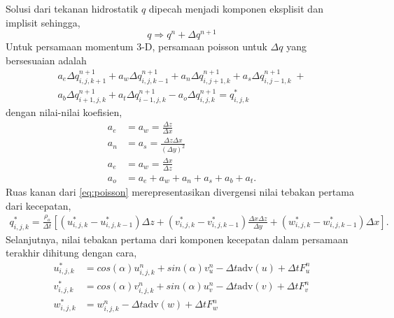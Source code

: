 \begin{spacing}{1.5}
	Solusi dari tekanan hidrostatik $q$ dipecah menjadi komponen eksplisit dan implisit sehingga,
	\begin{equation*}
		q \Rightarrow q^n + \Delta q^{n+1}
	\end{equation*}
	Untuk persamaan momentum 3-D, persamaan poisson untuk $\Delta q$ yang bersesuaian adalah
	\begin{equation}\label{eq:poisson}
		\begin{aligned}
			a_e \Delta q_{i,j,k+1}^{n+1} + a_w \Delta q_{i,j,k-1}^{n+1} + a_n \Delta q_{i,j+1,k}^{n+1} + a_s \Delta q_{i,j-1,k}^{n+1} \; + \\
			a_b \Delta q_{i+1,j,k}^{n+1} + 
			a_t \Delta q_{i-1,j,k}^{n+1} -
			a_o \Delta q_{i,j,k}^{n+1} = q_{i,j,k}^{*}
		\end{aligned}
	\end{equation}
	dengan nilai-nilai koefisien,
	\begin{equation}
		\begin{aligned}
			a_e &= a_w = \frac{\Delta z}{\Delta x} \\
			a_n &= a_s = \frac{\Delta z \Delta x}{(\Delta y)^2} \\
			a_e &= a_w = \frac{\Delta x}{\Delta z} \\
			a_o &= a_e + a_w + a_n + a_s + a_b + a_t.
		\end{aligned}
	\end{equation}
	Ruas kanan dari \ref{eq:poisson} merepresentasikan divergensi nilai tebakan pertama dari kecepatan, 
	\begin{equation*}
		\begin{aligned}
		q_{i,j,k}^{*} = \frac{\rho_o}{\Delta t}\left[(u_{i,j,k}^{*}-u_{i,j,k-1}^{*})\Delta z +  (v_{i,j,k}^{*}-v_{i,j,k-1}^{*})\frac{\Delta x \Delta z}{\Delta y}+(w_{i,j,k}^{*}-w_{i,j,k-1}^{*})\Delta x\right].
		\end{aligned}
	\end{equation*}
	Selanjutnya, nilai tebakan pertama dari komponen kecepatan dalam persamaan terakhir dihitung dengan cara,
	\begin{equation}
		\begin{aligned}
			u_{i,j,k}^{*} &= cos(\alpha)u_{i,j,k}^{n}+sin(\alpha)v_{u}^{n} - \Delta t \text{adv}(u) + \Delta t F_{u}^{n}\\
			v_{i,j,k}^{*} &= cos(\alpha)v_{i,j,k}^{n}+sin(\alpha)u_{v}^{n} - \Delta t \text{adv}(v) + \Delta t F_{v}^{n}\\
			w_{i,j,k}^{*} &= w_{i,j,k}^{n} - \Delta t \text{adv}(w) + \Delta t F_{w}^{n}
		\end{aligned}

\end{equation}
\end{spacing}

